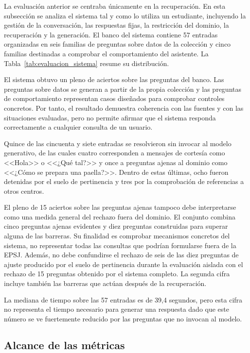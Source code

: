 La evaluación anterior se centraba únicamente en la
recuperación. En esta subsección se analiza el sistema tal y como lo utiliza un
estudiante, incluyendo la gestión de la conversación, las respuestas fijas,
la restricción del dominio, la recuperación y la generación. El banco del
sistema contiene 57 entradas organizadas en seis familias de preguntas sobre
datos de la colección y cinco familias destinadas a comprobar el
comportamiento del asistente. La Tabla~\ref{tab:evaluacion_sistema} resume su
distribución.



El sistema obtuvo un pleno de aciertos sobre las preguntas del banco. Las preguntas sobre datos se generan a partir de la propia colección y las preguntas de comportamiento representan casos diseñados para comprobar controles concretos. Por tanto, el resultado demuestra coherencia con las fuentes y con las situaciones evaluadas, pero no permite afirmar que el sistema responda correctamente a cualquier consulta de un usuario.


Quince de las cincuenta y siete entradas se resolvieron sin invocar al modelo generativo, de las cuales cuatro corresponden a mensajes de cortesía como <<Hola>> o <<¿Qué tal?>> y once a preguntas ajenas al dominio como <<¿Cómo se prepara una paella?>>. Dentro de estas últimas, ocho fueron detenidas por el suelo de pertinencia y tres por la comprobación de referencias a otros centros. 

El pleno de 15 aciertos sobre las preguntas ajenas tampoco debe interpretarse como una medida general del rechazo fuera del dominio. El conjunto combina cinco preguntas ajenas evidentes y diez preguntas construidas para superar alguna de las barreras. Su finalidad es comprobar mecanismos concretos del sistema, no representar todas las consultas que podrían formularse fuera de la EPSJ. Además, no debe confundirse el rechazo de seis de las diez preguntas de ajuste producido por el suelo de pertinencia durante la evaluación aislada con el rechazo de 15 preguntas obtenido por el sistema completo. La segunda cifra incluye también las
barreras que actúan después de la recuperación.

La mediana de tiempo sobre las 57 entradas es de 39,4 segundos, pero esta cifra no representa el tiempo necesario para generar una respuesta dado que este número se ve fuertemente reducido por las preguntas que no invocan al modelo. 

\subsection{Alcance de las métricas}
\label{secc:metricas_no_capturan}



